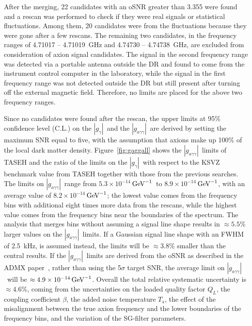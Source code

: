 \documentclass[%
 reprint,prl, %
superscriptaddress,
nobibnotes,
 amsmath,amssymb,
 aps,
]{revtex4-2}
\newcommand{\gagg}{\ensuremath{\left|g_{a\gamma\gamma}\right|}}
\newcommand{\ggamma}{\ensuremath{\left|g_{\gamma}\right|}}
\newcommand{\ma}{\ensuremath{m_a}}
\newcommand{\ta}{\ensuremath{T_\text{a}}}
\newcommand{\muevcc}{\ensuremath{\,\mu\text{e\hspace{-.08em}V}}}
\newcommand{\GeVinv}{\ensuremath{\,\text{Ge\hspace{-.08em}V}^{-1}}}
\newcommand{\flo}{\ensuremath{4.70750}}
\newcommand{\fhi}{\ensuremath{4.79815}}
\newcommand{\mlo}{\ensuremath{19.4687}}
\newcommand{\mhi}{\ensuremath{19.8436}}
\newcommand{\avelimit}{\ensuremath{8.2\times 10^{-14}}} %
\newcommand{\ADMXavelimit}{\ensuremath{4.9\times 10^{-14}}}
\newcommand{\lolimit}{\ensuremath{5.3\times 10^{-14}}}
\newcommand{\hilimit}{\ensuremath{8.9\times 10^{-14}}}
\begin{document}
After the merging, 22 candidates with an oSNR greater than 3.355 were found and 
a rescan was performed to check if they were real signals  
or statistical fluctuations.        
Among them, 20 candidates were from the fluctuations because they were gone 
after a few rescans. 
The remaining two candidates, in the frequency ranges of 
4.71017 -- 4.71019~GHz and 4.74730 -- 4.74738~GHz, are excluded from 
consideration of axion signal candidates. The signal in the second frequency 
range was detected via a portable antenna outside the DR and found 
to come from the instrument control computer in the laboratory, while the 
signal in the first frequency range was not 
detected outside the DR but still present after 
turning off the external magnetic field. 
Therefore, no limits are placed for the above two frequency ranges.  

Since no candidates were found after the rescan, the upper limits 
at 95\% confidence level (C.L.) on the \ggamma\ and the 
 \gagg\ are derived by setting the maximum SNR equal to five, 
with the assumption that axions make up 100\% of the local dark matter 
density.  
Figure~\ref{fig:gaggall} shows the \gagg\ limits of TASEH and the 
ratio of the limits on the \ggamma\ 
with respect to the KSVZ benchmark value 
from TASEH together with those from the previous searches. 
The limits on 
\gagg\ range from \lolimit\GeVinv\ to \hilimit\GeVinv, with an average 
value of \avelimit\GeVinv; the lowest value comes from the frequency bins with 
additional eight times more data from the rescans, while the highest value 
comes from the frequency bins near the boundaries of the spectrum. 
%
The analysis that merges bins without 
assuming a signal line shape results in $\approx5.5$\% larger values on the 
\gagg\ limits. If a Gaussian signal line shape with an FWHM of 2.5~kHz,  
 is assumed instead, the limits will be $\approx3.8$\% smaller than the 
central results. If the \gagg\ limits are derived from the oSNR as 
described in the ADMX paper~\cite{ADMXVIII},
rather than using the 5$\sigma$ target SNR, the average limit on \gagg\ will 
be $\approx\ADMXavelimit\GeVinv$. 
%
Overall the total relative systematic uncertainty is 
$\approx 4.6\%$, coming from the uncertainties on the loaded quality 
factor $Q_L$, the coupling coefficient $\beta$, the added noise temperature 
\ta, the effect of the misalignment between the true axion frequency and 
the lower boundaries of the frequency bins, and the variation of the 
SG-filter parameters. 
\end{document}
